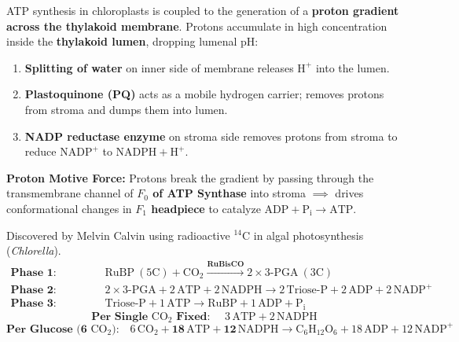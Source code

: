 \documentclass[10pt,a4paper]{article}
\begin{document}
\begin{conceptbox}
ATP synthesis in chloroplasts is coupled to the generation of a \textbf{proton gradient across the thylakoid membrane}. Protons accumulate in high concentration inside the \textbf{thylakoid lumen}, dropping lumenal pH:
\begin{enumerate}
  \item \textbf{Splitting of water} on inner side of membrane releases $\mathrm{H}^+$ into the lumen.
  \item \textbf{Plastoquinone (PQ)} acts as a mobile hydrogen carrier; removes protons from stroma and dumps them into lumen.
  \item \textbf{NADP reductase enzyme} on stroma side removes protons from stroma to reduce $\mathrm{NADP}^+$ to $\mathrm{NADPH} + \mathrm{H}^+$.
\end{enumerate}
\textbf{Proton Motive Force:} Protons break the gradient by passing through the transmembrane channel of \textbf{$F_0$ of ATP Synthase} into stroma $\implies$ drives conformational changes in \textbf{$F_1$ headpiece} to catalyze $\mathrm{ADP} + \mathrm{P_i} \to \mathrm{ATP}$.
\end{conceptbox}

\begin{formulabox}
Discovered by Melvin Calvin using radioactive $^{14}\mathrm{C}$ in algal photosynthesis (\textit{Chlorella}).
\begin{align*}
  \textbf{Phase 1: Carboxylation: } & \mathrm{RuBP}\ (5\mathrm{C}) + \mathrm{CO_2} \xrightarrow{\mathbf{RuBisCO}} 2 \times 3\text{-PGA}\ (3\mathrm{C})\\
  \textbf{Phase 2: Reduction: } & 2 \times 3\text{-PGA} + 2\,\mathrm{ATP} + 2\,\mathrm{NADPH} \to 2\,\text{Triose-P} + 2\,\mathrm{ADP} + 2\,\mathrm{NADP}^+\\
  \textbf{Phase 3: Regeneration: } & \text{Triose-P} + 1\,\mathrm{ATP} \longrightarrow \mathrm{RuBP} + 1\,\mathrm{ADP} + \mathrm{P_i}
\end{align*}
\begin{equation}
  \textbf{Per Single } \mathrm{CO_2} \textbf{ Fixed: } \quad 3\,\mathrm{ATP} + 2\,\mathrm{NADPH}
\end{equation}
\begin{equation}
  \textbf{Per Glucose (6 } \mathrm{CO_2}\textbf{):} \quad 6\,\mathrm{CO_2} + \mathbf{18\,\mathrm{ATP}} + \mathbf{12\,\mathrm{NADPH}} \longrightarrow \mathbf{\mathrm{C_6H_{12}O_6}} + 18\,\mathrm{ADP} + 12\,\mathrm{NADP}^+
\end{equation}
\end{formulabox}
\end{document}
